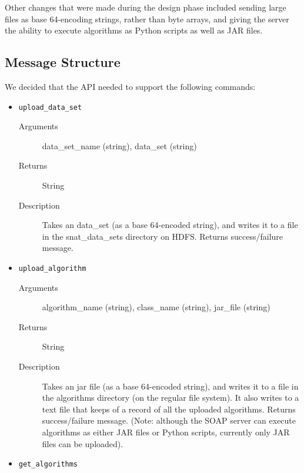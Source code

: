 Other changes that were made during the design phase included sending large files as base 64-encoding strings, rather than byte arrays, and giving the server the ability to execute algorithms as Python scripts as well as JAR files.

\subsection{Message Structure}

We decided that the API needed to support the following commands:

\begin{itemize}
    \item {\tt upload\_data\_set}

    \begin{description}        
        \item[Arguments] data\_set\_name (string), data\_set (string)
        
        \item[Returns] String
        
        \item[Description] Takes an data\_set (as a base 64-encoded string), and
writes it to a file in the snat\_data\_sets directory on HDFS. Returns
success/failure message.
    \end{description}
    
    \item {\tt upload\_algorithm}

    \begin{description}        
        \item[Arguments] algorithm\_name (string), class\_name (string),
jar\_file (string)
        
        \item[Returns] String
        
        \item[Description] Takes an jar file (as a base 64-encoded string), and
writes it to a file in the algorithms directory (on the regular file system). It
also writes to a text file that keeps of a record of all the uploaded
algorithms. Returns success/failure message. (Note: although the SOAP server can
execute algorithms as either JAR files or Python scripts, currently only JAR
files can be uploaded).
    \end{description}
    
    \item {\tt get\_algorithms}


\end{itemize}
